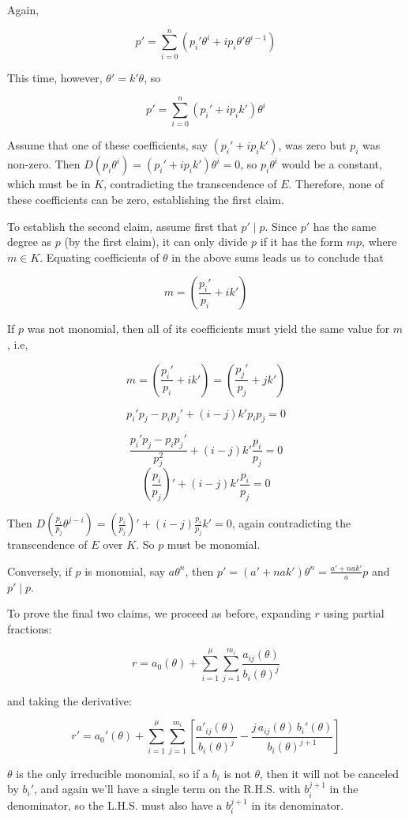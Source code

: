 \proof

Again,

$$p' = \sum_{i=0}^n (p_i' \theta^i + i p_i \theta' \theta^{i-1})$$

This time, however, $\theta' = k'\theta$, so

$$p' = \sum_{i=0}^n (p_i' + i p_i k') \theta^i$$

Assume that one of these coefficients, say $(p_i' + i p_i k')$, was
zero but $p_i$ was non-zero.  Then $D(p_i \theta^i) = (p_i' + i p_i
k')\theta^i = 0$, so $p_i \theta^i$ would be a constant, which must be in $K$,
contradicting the transcendence of $E$.  Therefore, none of these
coefficients can be zero, establishing the first claim.

To establish the second claim, assume first that $p' \mid p$.  Since
$p'$ has the same degree as $p$ (by the first claim), it can only
divide $p$ if it has the form $mp$, where $m \in K$.  Equating
coefficients of $\theta$ in the above sums leads us to conclude that

$$m = (\frac{p_i'}{p_i} + i k')$$

If $p$ was not monomial, then all of its coefficients must
yield the same value for $m$, i.e,

$$m = (\frac{p_i'}{p_i} + i k') = (\frac{p_j'}{p_j} + j k')$$

$$p_i' p_j - p_i p_j' + (i - j) k' p_i p_j = 0$$

$$\frac{p_i' p_j - p_i p_j'}{p_j^2} + (i - j) k' \frac{p_i}{p_j} = 0$$
$$\left(\frac{p_i}{p_j}\right)' + (i - j) k' \frac{p_i}{p_j} = 0$$

Then $D(\frac{p_i}{p_j} \theta^{j-i}) = \left(\frac{p_i}{p_j}\right)'
+ (i - j) \frac{p_i}{p_j} k' = 0$, again contradicting the
transcendence of $E$ over $K$.  So $p$ must be monomial.

Conversely, if $p$ is monomial, say $a\theta^n$, then $p' = (a' +
n a k') \theta^n = \frac{a' + n a k'}{a} p$ and $p' \mid p$.

To prove the final two claims, we proceed as before, expanding $r$
using partial fractions:

$$r = a_0(\theta) + \sum_{i=1}^\mu \sum_{j=1}^{m_i} \frac{a_{ij}(\theta)}{b_i(\theta)^j}$$

and taking the derivative:

$$r' = a_0'(\theta) + \sum_{i=1}^\mu \sum_{j=1}^{m_i} \left[
\frac{a'_{ij}(\theta)}{b_i(\theta)^j} - \frac{j\, a_{ij}(\theta)\,
b_i'(\theta)}{b_i(\theta)^{j+1}} \right]$$

$\theta$ is the only irreducible monomial, so if a $b_i$ is not
$\theta$, then it will not be canceled by $b_i'$, and again we'll have
a single term on the R.H.S. with $b_i^{j+1}$ in the denominator, so
the L.H.S. must also have a $b_i^{j+1}$ in its denominator.

